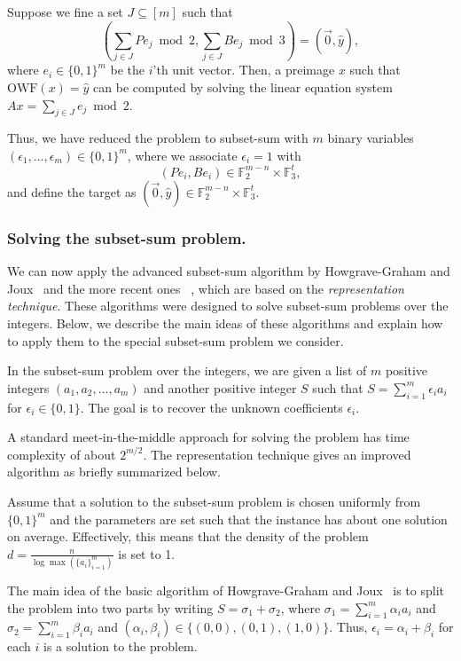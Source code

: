 \documentclass[orivec,envcountsect]{llncs}
\newcommand{\OWF}{\text{OWF}}
\begin{document}
Suppose we fine a set $J \subseteq [m]$ such that
$$\left( \sum_{j \in J} Pe_j  \bmod 2, \sum_{j \in J} Be_j  \bmod 3 \right) = (\vec{0},\hat{y}),$$
where $e_i \in \{0,1\}^m$ be the $i$'th unit vector.
Then, a preimage $x$ such that $\OWF(x) = \hat{y}$ can be computed by solving the linear equation system
$Ax = \sum_{j \in J} e_j  \bmod 2$.

Thus, we have reduced the problem to subset-sum with $m$ binary variables
$(\epsilon_1, \ldots, \epsilon_m) \in \{0,1\}^m$, where we associate $\epsilon_i = 1$
with $$(Pe_i, Be_i) \in \mathbb{F}_2^{m-n} \times \mathbb{F}_3^t,$$
and define the target
as $(\vec{0},\hat{y}) \in \mathbb{F}_2^{m-n} \times \mathbb{F}_3^t$.


\subsubsection{Solving the subset-sum problem.}

We can now apply the advanced subset-sum algorithm by
Howgrave{-}Graham and Joux~\cite{Howgrave-GrahamJ10} and the more recent ones
~\cite{BeckerCJ11,BonnetainBSS20},
which are based on the \emph{representation technique}.
These algorithms were designed to solve subset-sum problems over the integers.
Below, we describe the main ideas of these algorithms
and explain how to apply them to the special subset-sum problem
we consider.

In the subset-sum problem over the integers,
we are given a list of $m$ positive  integers $(a_1,a_2,\ldots,a_m)$
and another positive integer $S$ such that $S = \sum_{i=1}^{m} \epsilon_i a_i$
for $\epsilon_i \in \{0,1\}$. The goal is to recover the unknown coefficients $\epsilon_i$.

A standard meet-in-the-middle approach for solving the problem has time complexity of about $2^{m/2}$.
The representation technique gives an improved algorithm as briefly summarized below.

Assume that a solution to the subset-sum problem is chosen uniformly from $\{0,1\}^m$
and the parameters are set such that the instance has about one solution on average. Effectively, this means that the density of the problem $d = \tfrac{n}{\log \max(\{a_i\}_{i=1}^{m})}$ is set to 1.

The main idea of the basic algorithm of Howgrave{-}Graham and Joux~\cite{Howgrave-GrahamJ10}
is to split the problem into two parts by writing
$S = \sigma_1 + \sigma_2$,
where $\sigma_1 = \sum_{i=1}^{m} \alpha_i a_i$ and $\sigma_2 = \sum_{i=1}^{m} \beta_i a_i$
and $(\alpha_i,\beta_i) \in \{(0,0),(0,1),(1,0)\}$.
Thus, $\epsilon_i = \alpha_i + \beta_i$ for each $i$ is a solution to the problem.
\end{document}

